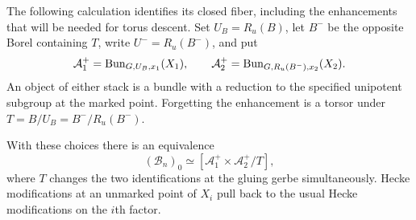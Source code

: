 The following calculation identifies its closed fiber, including the
enhancements that will be needed for torus descent.  Set
$U_B=R_u(B)$, let $B^-$ be the opposite Borel containing $T$, write
$U^-=R_u(B^-)$, and put
\[
 \mathcal A_1^+=\operatorname{Bun}_{G,U_B,x_1}(X_1),\qquad
 \mathcal A_2^+=\operatorname{Bun}_{G,R_u(B^-),x_2}(X_2).
\]
An object of either stack is a bundle with a reduction to the specified
unipotent subgroup at the marked point.  Forgetting the enhancement is
a torsor under $T=B/U_B=B^-/R_u(B^-)$.

\begin{lemma}\label{lem:construction-type-flags}
With these choices there is an equivalence
\begin{equation}\label{eq:construction-special-bun}
 (\mathcal B_n)_0
 \simeq [\mathcal A_1^+\times\mathcal A_2^+/T],
\end{equation}
where $T$ changes the two identifications at the gluing gerbe
simultaneously.  Hecke modifications at an unmarked point of $X_i$
pull back to the usual Hecke modifications on the $i$th factor.
\end{lemma}

